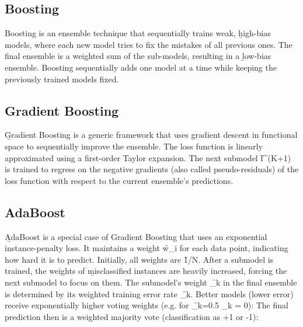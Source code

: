 \subsection{Boosting}
Boosting is an ensemble technique that sequentially trains weak, \b{high-bias} models, where each new model tries to fix the mistakes of all previous ones. The final ensemble is a weighted sum of the sub-models, resulting in a \b{low-bias} ensemble. Boosting sequentially adds one model at a time while keeping the previously trained models fixed.





\subsection{Gradient Boosting}
\b{Gradient Boosting} is a generic framework that uses gradient descent in functional space to sequentially improve the ensemble. The loss function is linearly approximated using a first-order Taylor expansion. The next submodel \f{f^{(K+1)}} is trained to regress on the negative gradients (also called pseudo-residuals) of the loss function with respect to the current ensemble's predictions.



\subsection{AdaBoost}
\b{AdaBoost} is a special case of Gradient Boosting that uses an exponential instance-penalty loss. It maintains a weight \f{w_i} for each data point, indicating how hard it is to predict. Initially, all weights are \f{1/N}. After a submodel is trained, the weights of \b{misclassified} instances are heavily increased, forcing the next submodel to focus on them.
The submodel's weight \f{\alpha_k} in the final ensemble is determined by its weighted training error rate \f{\epsilon_k}. Better models (lower error) receive exponentially higher voting weights (e.g. for \f{\epsilon_k=0.5 \rightarrow \alpha_k = 0}):
The final prediction then is a weighted majority vote (classification as +1 or -1):


